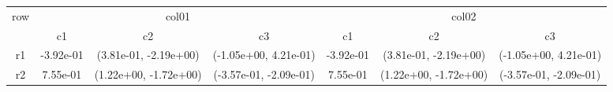 \begin{tabular}{ccccccc}
\toprule
\multirow{2}{*}{row}&\multicolumn{3}{c}{col01}&\multicolumn{3}{c}{col02}\tabularnewline
\cmidrule(lr){2-4}
\cmidrule(lr){5-7}
&c1&c2&c3&c1&c2&c3\tabularnewline
\midrule
r1&-3.92e-01& (3.81e-01, -2.19e+00)& (-1.05e+00, 4.21e-01)&-3.92e-01& (3.81e-01, -2.19e+00)& (-1.05e+00, 4.21e-01)\tabularnewline
r2&7.55e-01& (1.22e+00, -1.72e+00)& (-3.57e-01, -2.09e-01)&7.55e-01& (1.22e+00, -1.72e+00)& (-3.57e-01, -2.09e-01)\tabularnewline
\bottomrule
\end{tabular}
